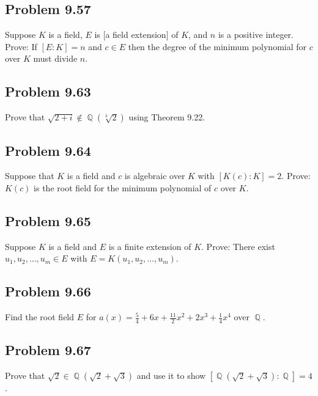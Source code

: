 \documentclass[letterpaper, 12pt]{amsart}
\DeclareMathOperator{\Q}{\mathbb{Q}}
\theoremstyle{definition}  %
\begin{document}
	\subsection*{Problem 9.57}
	\label{sub:problem_9_57}
	Suppose $K$ is a field, $E$ is [a field extension] of $K$, and $n$ is a positive integer.
	Prove: If $[E:K] = n$ and $c \in E$ then the degree of the minimum polynomial for $c$ over $K$ must divide $n$.

	\subsection*{Problem 9.63}
	\label{sub:problem_9_63}
	Prove that $\sqrt{2 + i} \notin \Q\left( \sqrt[3]{2} \right)$ using Theorem 9.22.

	\subsection*{Problem 9.64}
	\label{sub:problem_9_64}
	Suppose that $K$ is a field and $c$ is algebraic over $K$ with $[K(c) : K] = 2$.
	Prove: $K(c)$ is the root field for the minimum polynomial of $c$ over $K$.

	\subsection*{Problem 9.65}
	\label{sub:problem_9_65}
	Suppose $K$ is a field and $E$ is a finite extension of $K$.
	Prove: There exist $u_{1}, u_{2}, \dots, u_{m} \in E$ with $E = K(u_{1}, u_{2}, \dots, u_{m})$.

	\subsection*{Problem 9.66}
	\label{sub:problem_9_66}
	Find the root field $E$ for $a(x) = \frac{5}{4} + 6x + \frac{11}{2}x^{2} + 2x^{3} + \frac{1}{4}x^{4}$ over $\Q$.

	\subsection*{Problem 9.67}
	\label{sub:problem_9_67}
	Prove that $\sqrt{2} \in \Q\left( \sqrt{2} + \sqrt{3} \right)$ and use it to show $\left[ \Q\left(\sqrt{2} + \sqrt{3} \right) : \Q \right] = 4$.
\end{document}
